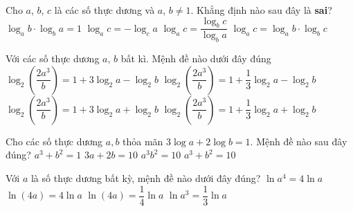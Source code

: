 

\begin{ex}%
	Cho $a$, $b$, $c$ là các số thực dương và $a$, $b\ne1$. Khẳng định nào  sau đây là \textbf{sai}?
	\choice 
		 {$\log_{a}b \cdot \log_{b}a=1$}
		{\True  $\log_{a}c=-\log_{c}a$}
		{$\log_{a}c=\dfrac{\log_{b}c}{\log_{b}a}$} 
		 {$\log_{a}c=\log_{a}b \cdot \log_{b}c$}
\end{ex}

\begin{ex}%
	Với các  số thực dương $a$, $b$ bất kì. Mệnh đề nào dưới đây đúng
	\choice 
		 {\True $\log_{2}\left(\dfrac{2a^{3}}{b}\right)=1+3\log_{2}a-\log_{2}b$}
		 {$\log_{2}\left(\dfrac{2a^{3}}{b}\right)=1+\dfrac{1}{3}\log_{2}a-\log_{2}b$}
		 {$\log_{2}\left(\dfrac{2a^{3}}{b}\right)=1+3\log_{2}a+\log_{2}b$}
		{$\log_{2}\left(\dfrac{2a^{3}}{b}\right)=1+\dfrac{1}{3}\log_{2}a+\log_{2}b$} 
\end{ex}

\begin{ex}%
	Cho các  số thực dương $a, b$ thỏa mãn $3\log a+2\log b=1$. Mệnh đề nào sau đây đúng?
	\choice 
		{$a^{3}+b^{2}=1$} 
		{$3a+2b=10$} 
		{\True $a^{3}b^{2}=10$} 
		{$a^{3}+b^{2}=10$} 
\end{ex}

\begin{ex}%
	Với $a$ là số thực dương bất  kỳ, mệnh đề nào dưới đây đúng?
	\choice 
		{\True $\ln  a^{4}=4\ln a$}
		{$\ln\left(4a\right)=4\ln a$} 
		 {$\ln\left(4a\right)=\dfrac{1}{4}\ln a$}
		{$\ln a^{3}=\dfrac{1}{3}\ln  a$}
\end{ex}

